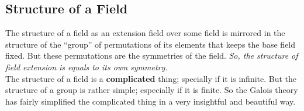 \subsection{Structure of a Field}
The structure of a field as an extension field over some field is mirrored in the structure of the ``group'' of  permutations of its elements that keeps the base field fixed. But these permutations are the symmetries of the field. \textit{So, the structure of field extension is equals to its own symmetry.}\\

The structure of a field is a \textbf{complicated} thing; specially if it is infinite. But the structure of a group is rather simple; especially if it is finite. So the Galois theory has fairly simplified the complicated thing in a very insightful and beautiful way.\\

